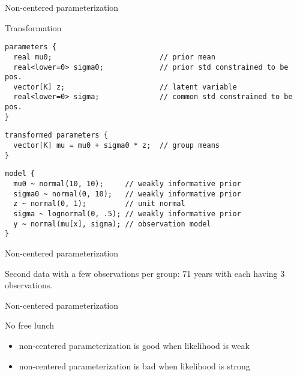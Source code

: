 \documentclass[finnish,english,t]{beamer}
\begin{document}
\begin{frame}[fragile]{Non-centered parameterization}

\vspace{-0.5\baselineskip}
Transformation

{\footnotesize
\begin{verbatim}
parameters {
  real mu0;                         // prior mean
  real<lower=0> sigma0;             // prior std constrained to be pos.
  vector[K] z;                      // latent variable
  real<lower=0> sigma;              // common std constrained to be pos.
}
\end{verbatim}
}
\vspace{-\baselineskip}
{\footnotesize
\begin{verbatim}
transformed parameters {
  vector[K] mu = mu0 + sigma0 * z;  // group means
}
\end{verbatim}
}
\vspace{-\baselineskip}
{\footnotesize
\begin{verbatim}
model {
  mu0 ~ normal(10, 10);     // weakly informative prior
  sigma0 ~ normal(0, 10);   // weakly informative prior
  z ~ normal(0, 1);         // unit normal
  sigma ~ lognormal(0, .5); // weakly informative prior
  y ~ normal(mu[x], sigma); // observation model
}
\end{verbatim}
}

\end{frame}

\begin{frame}[fragile]{Non-centered parameterization}

  Second data with a few observations per group: 71 years with
  each having 3 observations.


  
\end{frame}

\begin{frame}[fragile]{Non-centered parameterization}

  No free lunch

  \begin{itemize}
  \item non-centered parameterization is good when likelihood is weak
  \item non-centered parameterization is bad when likelihood is strong
  \end{itemize}
  
\end{frame}
\end{document}

